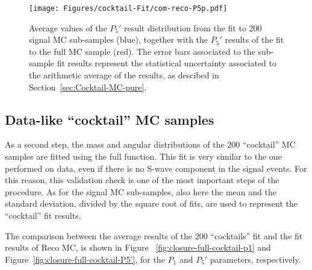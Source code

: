 \begin{figure}[!hbt]
  \centering
  \texttt{[image: Figures/cocktail-Fit/com-reco-P5p.pdf]}
  \caption{Average values of the $P_5'$ result distribution from the fit to 200 signal MC sub-samples (blue), together with the $P_5'$ results of the fit to the full MC sample (red). The error bars associated to the sub-sample fit results represent the statistical uncertainty associated to the arithmetic average of the results, as descibed in Section~\ref{sec:Cocktail-MC-pure}.}
  \label{fig:sub-samp-P5p}
\end{figure}






\subsection{Data-like ``cocktail'' MC samples}
\label{sec:Cocktail-MC-full}

As a second step, the mass and angular distributions of the 200 ``cocktail'' MC samples are fitted using the full \pdf function.
This fit is very similar to the one performed on data, even if there is no S-wave component in the signal events.
For this reason, this validation check is one of the most important steps of the procedure.
As for the signal MC sub-samples, also here the mean and the standard deviation, divided by the square root of fits, are used to represent the ``cocktail'' fit results.

The comparison between the average results of the 200 ``cocktails'' fit and the fit results of Reco MC, is shown in Figure ~\ref{fig:closure-full-cocktail-p1} and Figure~\ref{fig:closure-full-cocktail-P5'}, for the $P_1$ and $P_5'$  parameters, respectively.



